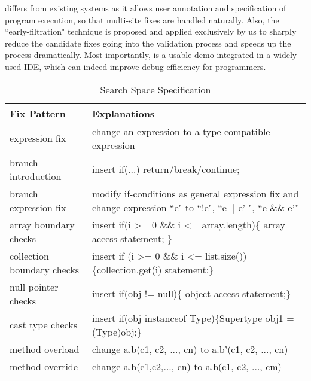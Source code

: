 \SmartDebug differs from existing systems as it allows user annotation and specification of program execution, so that multi-site fixes are handled naturally. Also, the ``early-filtration" technique is proposed and applied exclusively by us to sharply reduce the candidate fixes going into the validation process and speeds up the process dramatically. Most importantly, \SmartDebug is a usable demo integrated in a widely used IDE, which can indeed improve debug efficiency for programmers.
\begin{table*}[!t]
	\centering
	\caption{Search Space Specification}
	\label{search-space}
	\begin{tabular}{|l|l|}
		\hline
		Fix Pattern                & Explanations                                                                                                                                      \\ \hline
		expression fix     & change an expression to a type-compatible
		expression                                                                                              \\ \hline
		branch introduction        & insert if(...) return/break/continue;                                                                                \\ \hline
		branch expression fix      & modify if-conditions as general expression fix and change expression ``e" to ``!e", ``e || e' ", ``e \&\& e'" 
		\\ \hline
		array boundary checks      & insert if(i \textgreater= 0 \&\& i \textless= array.length)\{ array access statement; \}                                                          \\ \hline
		collection boundary checks & insert if (i \textgreater= 0 \&\& i \textless= list.size())\{collection.get(i) statement;\}                                                       \\ \hline
		null pointer checks        & insert if(obj != null)\{ object access statement;\}                                                                                                  \\ \hline
		cast type checks           & insert if(obj instanceof Type)\{Supertype obj1 = (Type)obj;\}                                                                                          \\ \hline
		method overload            & change a.b(c1, c2, ..., cn) to a.b'(c1, c2, ..., cn)                                                                                              \\ \hline
		method override            & change a.b(c1,c2,..., cn) to a.b(c1, c2, ..., cm)                                                                                                 \\ \hline
	\end{tabular}
	\vspace{-1.8em}
\end{table*}

